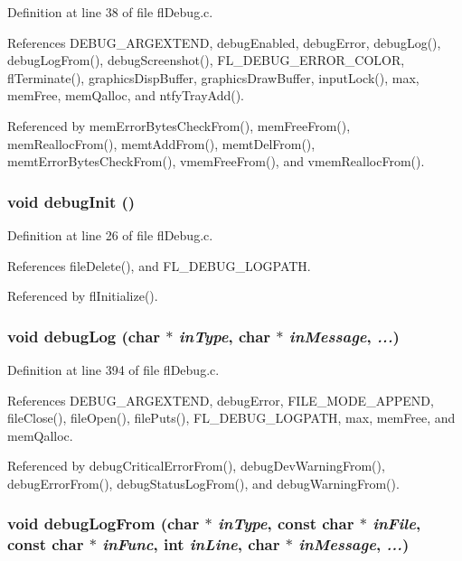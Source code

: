 Definition at line 38 of file fl\-Debug.c.

References DEBUG\_\-ARGEXTEND, debug\-Enabled, debug\-Error, debug\-Log(), debug\-Log\-From(), debug\-Screenshot(), FL\_\-DEBUG\_\-ERROR\_\-COLOR, fl\-Terminate(), graphics\-Disp\-Buffer, graphics\-Draw\-Buffer, input\-Lock(), max, mem\-Free, mem\-Qalloc, and ntfy\-Tray\-Add().

Referenced by mem\-Error\-Bytes\-Check\-From(), mem\-Free\-From(), mem\-Realloc\-From(), memt\-Add\-From(), memt\-Del\-From(), memt\-Error\-Bytes\-Check\-From(), vmem\-Free\-From(), and vmem\-Realloc\-From().
\subsubsection{\setlength{\rightskip}{0pt plus 5cm}void debug\-Init ()}\label{flDebug_8h_e2643425aaa970f732820d91522a9111}




Definition at line 26 of file fl\-Debug.c.

References file\-Delete(), and FL\_\-DEBUG\_\-LOGPATH.

Referenced by fl\-Initialize().
\subsubsection{\setlength{\rightskip}{0pt plus 5cm}void debug\-Log (char $\ast$ {\em in\-Type}, char $\ast$ {\em in\-Message},  {\em ...})}\label{flDebug_8h_85f3e65773a4f1bc98b37d29c6dde276}




Definition at line 394 of file fl\-Debug.c.

References DEBUG\_\-ARGEXTEND, debug\-Error, FILE\_\-MODE\_\-APPEND, file\-Close(), file\-Open(), file\-Puts(), FL\_\-DEBUG\_\-LOGPATH, max, mem\-Free, and mem\-Qalloc.

Referenced by debug\-Critical\-Error\-From(), debug\-Dev\-Warning\-From(), debug\-Error\-From(), debug\-Status\-Log\-From(), and debug\-Warning\-From().
\subsubsection{\setlength{\rightskip}{0pt plus 5cm}void debug\-Log\-From (char $\ast$ {\em in\-Type}, const char $\ast$ {\em in\-File}, const char $\ast$ {\em in\-Func}, int {\em in\-Line}, char $\ast$ {\em in\-Message},  {\em ...})}\label{flDebug_8h_79821f9452c6693004f6d30bb36ac990}




